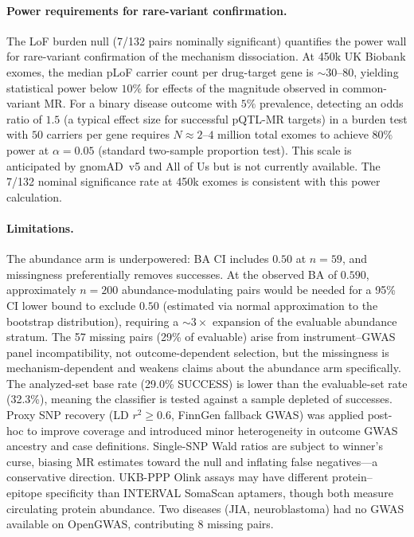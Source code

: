 \documentclass[11pt]{article}
\begin{document}
\paragraph{Power requirements for rare-variant confirmation.}
The LoF burden null (7/132 pairs nominally significant) quantifies the power wall for rare-variant confirmation of the mechanism dissociation. At 450k UK Biobank exomes, the median pLoF carrier count per drug-target gene is ${\sim}30$--$80$, yielding statistical power below $10\%$ for effects of the magnitude observed in common-variant MR. For a binary disease outcome with $5\%$ prevalence, detecting an odds ratio of $1.5$ (a typical effect size for successful pQTL-MR targets) in a burden test with $50$ carriers per gene requires $N \approx 2$--$4$ million total exomes to achieve $80\%$ power at $\alpha = 0.05$ (standard two-sample proportion test). This scale is anticipated by gnomAD~v5 and All of Us but is not currently available. The 7/132 nominal significance rate at 450k exomes is consistent with this power calculation.

\paragraph{Limitations.}
The abundance arm is underpowered: BA CI includes $0.50$ at $n = 59$, and missingness preferentially removes successes. At the observed BA of $0.590$, approximately $n = 200$ abundance-modulating pairs would be needed for a 95\% CI lower bound to exclude $0.50$ (estimated via normal approximation to the bootstrap distribution), requiring a ${\sim}3\times$ expansion of the evaluable abundance stratum. The 57 missing pairs (29\% of evaluable) arise from instrument--GWAS panel incompatibility, not outcome-dependent selection, but the missingness is mechanism-dependent and weakens claims about the abundance arm specifically. The analyzed-set base rate (29.0\% SUCCESS) is lower than the evaluable-set rate (32.3\%), meaning the classifier is tested against a sample depleted of successes. Proxy SNP recovery (LD $r^2 \geq 0.6$, FinnGen fallback GWAS) was applied post-hoc to improve coverage and introduced minor heterogeneity in outcome GWAS ancestry and case definitions. Single-SNP Wald ratios are subject to winner's curse, biasing MR estimates toward the null and inflating false negatives---a conservative direction. UKB-PPP Olink assays may have different protein--epitope specificity than INTERVAL SomaScan aptamers, though both measure circulating protein abundance. Two diseases (JIA, neuroblastoma) had no GWAS available on OpenGWAS, contributing 8 missing pairs.
\end{document}
